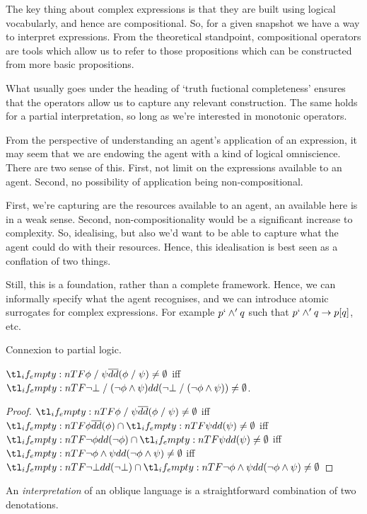 \documentclass[10pt]{article}
\def\ltrans{\mathrel{%
    /%
  }}
\begin{document}
The key thing about complex expressions is that they are built using logical vocabularly, and hence are compositional.
So, for a given snapshot we have a way to interpret expressions.
From the theoretical standpoint, compositional operators are tools which allow us to refer to those propositions which can be constructed from more basic propositions.

What usually goes under the heading of `truth fuctional completeness' ensures that the operators allow us to capture any relevant construction.
The same holds for a partial interpretation, {\color{red} so long as we're interested in monotonic operators}.

From the perspective of understanding an agent's application of an expression, it may seem that we are endowing the agent with a kind of logical omniscience.
There are two sense of this.
First, not limit on the expressions available to an agent.
Second, no possibility of application being non-compositional.

First, we're capturing are the resources available to an agent, an available here is in a weak sense.
Second, non-compositionality would be a significant increase to complexity.
So, idealising, but also we'd want to be able to capture what the agent could do with their resources.
Hence, this idealisation is best seen as a conflation of two things.

Still, this is a foundation, rather than a complete framework.
Hence, we can informally specify what the agent recognises, and we can introduce atomic surrogates for complex expressions.
For example \(p `\land' q\) such that \(p `\land' q \rightarrow p[q]\), etc. 


Connexion to partial logic.

\begin{fact}
  \(\ideno{\phi \ltrans \psi} \ne \emptyset\) iff \(\cdeno{\lnot\bot \ltrans (\lnot\phi \land \psi)} \ne \emptyset\).
  \begin{proof}
    \(\ideno{\phi \ltrans \psi} \ne \emptyset\) iff \(\ideno{\phi} \cap \cdeno{\psi} \ne \emptyset\) iff \(\cdeno{\lnot\phi} \cap \cdeno{\psi} \ne \emptyset\) iff \(\cdeno{\lnot\phi \land \psi} \ne \emptyset\) iff \(\cdeno{\lnot\bot} \cap \cdeno{\lnot\phi \land \psi} \ne \emptyset\)
  \end{proof}
\end{fact}

An \emph{interpretation} of an oblique language is a straightforward combination of two denotations.
\end{document}
